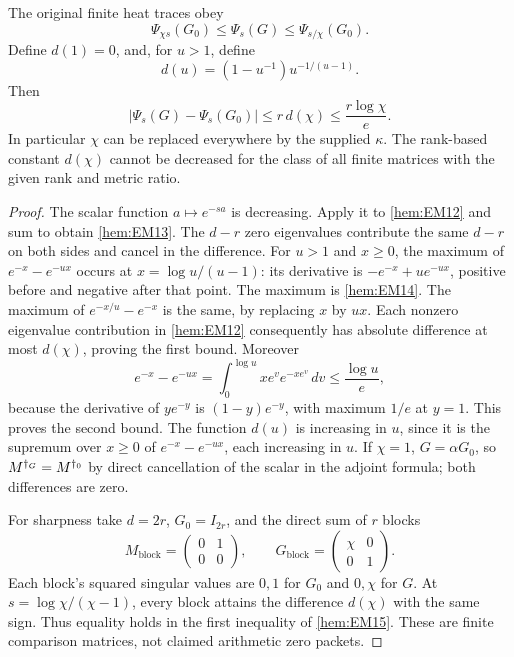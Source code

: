 \documentclass[11pt]{article}
\begin{document}
\begin{hemtheorem}
The original finite heat traces obey
\begin{equation}
 \Psi_{\chi s}(G_0)\le\Psi_s(G)\le\Psi_{s/\chi}(G_0).
 \tag{EM13}\label{hem:EM13}
\end{equation}
Define \(d(1)=0\), and, for \(u>1\), define
\begin{equation}
 d(u)=(1-u^{-1})u^{-1/(u-1)}.
 \tag{EM14}\label{hem:EM14}
\end{equation}
Then
\begin{equation}
 |\Psi_s(G)-\Psi_s(G_0)|
 \le r\,d(\chi)\le\frac{r\log\chi}{e}.
 \tag{EM15}\label{hem:EM15}
\end{equation}
In particular \(\chi\) can be replaced everywhere by the supplied
\(\kappa\). The rank-based constant \(d(\chi)\) cannot be decreased for
the class of all finite matrices with the given rank and metric ratio.
\end{hemtheorem}
\begin{proof}
The scalar function \(a\mapsto e^{-sa}\) is decreasing. Apply it to
\eqref{hem:EM12} and sum to obtain \eqref{hem:EM13}. The \(d-r\) zero
eigenvalues contribute the same \(d-r\) on both sides and cancel in
the difference. For \(u>1\) and \(x\ge0\), the maximum of
\(e^{-x}-e^{-ux}\) occurs at \(x=\log u/(u-1)\):
its derivative is \(-e^{-x}+u e^{-ux}\), positive before and negative
after that point. The maximum is \eqref{hem:EM14}. The maximum of
\(e^{-x/u}-e^{-x}\) is the same, by replacing \(x\) by \(ux\).
Each nonzero eigenvalue contribution in \eqref{hem:EM12} consequently has
absolute difference at most \(d(\chi)\), proving the first bound.
Moreover
\[
 e^{-x}-e^{-ux}=\int_0^{\log u}xe^v e^{-xe^v}\,dv
       \le\frac{\log u}{e},
\]
because the derivative of \(y e^{-y}\) is \((1-y)e^{-y}\), with maximum
\(1/e\) at \(y=1\). This proves the second bound.
The function \(d(u)\) is increasing in \(u\), since it is the supremum
over \(x\ge0\) of \(e^{-x}-e^{-ux}\), each increasing in \(u\).
If \(\chi=1\), \(G=\alpha G_0\), so \(M^{\dagger_G}=M^{\dagger_0}\)
by direct cancellation of the scalar in the adjoint formula; both
differences are zero.

For sharpness take \(d=2r\), \(G_0=I_{2r}\), and the direct sum of \(r\)
blocks
\[
 M_{\mathrm{block}}=\begin{pmatrix}0&1\\0&0\end{pmatrix},
 \qquad
 G_{\mathrm{block}}=\begin{pmatrix}\chi&0\\0&1\end{pmatrix}.
\]
Each block's squared singular values are \(0,1\) for \(G_0\) and
\(0,\chi\) for \(G\). At \(s=\log\chi/(\chi-1)\), every block attains
the difference \(d(\chi)\) with the same sign. Thus equality holds
in the first inequality of \eqref{hem:EM15}. These are finite comparison
matrices, not claimed arithmetic zero packets.
\end{proof}
\end{document}
